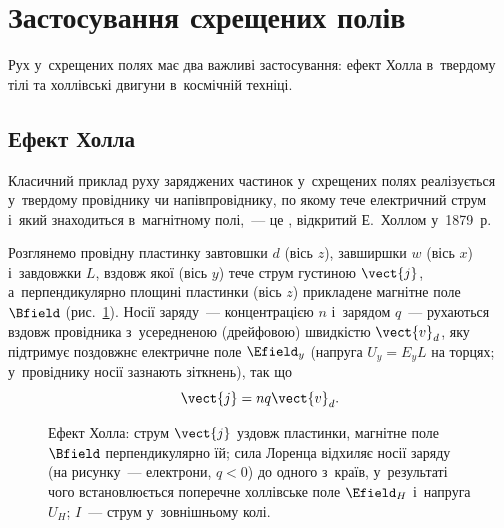 \section{Застосування схрещених полів}\hypertarget{crossed-fields-applications}{}

Рух у~схрещених полях має два важливі застосування: ефект Холла в~твердому тілі та холлівські двигуни в~космічній техніці.


\subsection*{Ефект Холла}


Класичний приклад руху заряджених частинок у~схрещених полях реалізується у~твердому провіднику чи напівпровіднику, по якому тече електричний струм і~який знаходиться в~магнітному полі,~--- це , відкритий Е.~Холлом у~1879~р.~\cite{Hall1879}

Розглянемо провідну пластинку завтовшки $d$ (вісь $z$), завширшки $w$ (вісь $x$) і~завдовжки $L$, вздовж якої (вісь $y$) тече струм густиною $\vect{j}$, а~перпендикулярно площині пластинки (вісь $z$) прикладене магнітне поле $\Bfield$ (рис.~\ref{tikz:hall_effect}). Носії заряду~--- концентрацією $n$ і~зарядом $q$~--- рухаються вздовж провідника з~усередненою (дрейфовою) швидкістю $\vect{v}_d$, яку підтримує поздовжнє електричне поле $\Efield_y$ (напруга $U_y = E_yL$ на торцях; у~провіднику носії зазнають зіткнень), так що
\begin{equation}\label{eq:hall_current_density}
	\vect{j} = nq\vect{v}_d.
\end{equation}

\begin{figure}[h!]
	\centering
	\caption{Ефект Холла: струм $\vect{j}$ уздовж пластинки, магнітне поле $\Bfield$ перпендикулярно їй; сила Лоренца відхиляє носії заряду (на рисунку~--- електрони, $q<0$) до одного з~країв, у~результаті чого встановлюється поперечне холлівське поле $\Efield_H$ і~напруга $U_H$; $I$~--- струм у~зовнішньому колі.}
	\label{tikz:hall_effect}
\end{figure}

